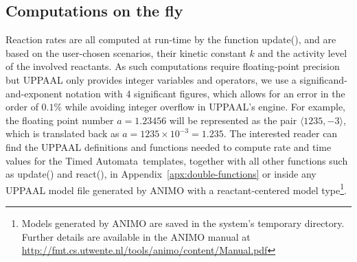 \documentclass{llncs}
\newcommand{\tas}{Timed Automata}
\begin{document}
% 

\subsection{Computations on the fly}\label{sec:rates-ta-model}
Reaction rates are all computed at run-time by the function {\sf update()},
and are based on the user-chosen scenarios, their kinetic constant $k$ and the activity level of the involved reactants.
As such computations require floating-point precision but UPPAAL only provides integer
variables and operators, we use a significand-and-exponent notation with 4 significant figures, which allows for an error
in the order of $0.1 \%$ while 
avoiding integer overflow in UPPAAL's engine.
For example, the floating point number $a = 1.23456$ will be represented as the pair $\langle 1235, -3 \rangle$,
which is translated back as $a = 1235 \times 10^{-3} = 1.235$.
The interested reader can find the UPPAAL definitions and functions needed to compute rate and time values for the \tas\ templates,
together with all other functions such as {\sf update()} and {\sf react()},
in Appendix~\ref{apx:double-functions} or 
inside any UPPAAL model file generated by ANIMO with a reactant-centered model type\footnote{Models generated
by ANIMO are saved in the system's temporary directory. Further details are available in
the ANIMO manual at \url{http://fmt.cs.utwente.nl/tools/animo/content/Manual.pdf}}.
\end{document}
